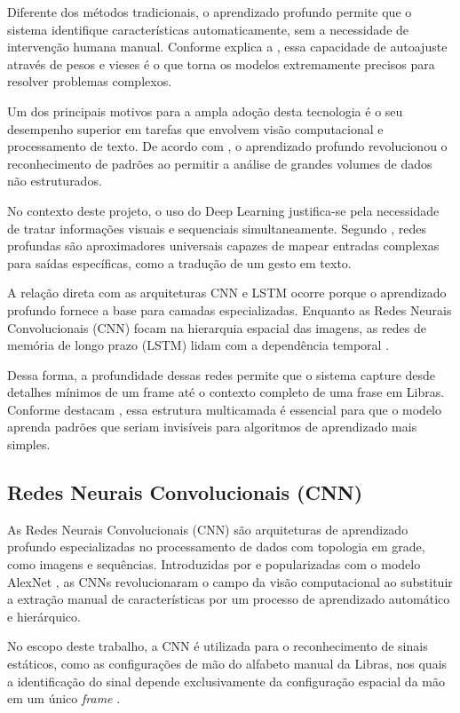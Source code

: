 \documentclass[
    12pt,                %
    openright,           %
    oneside,             %
    a4paper,             %
    english,             %
    brazil               %
]{abntex2}
\begin{document}
Diferente dos métodos tradicionais, o aprendizado profundo permite que o sistema identifique características automaticamente, sem a necessidade de intervenção humana manual. Conforme explica a , essa capacidade de autoajuste através de pesos e vieses é o que torna os modelos extremamente precisos para resolver problemas complexos.

Um dos principais motivos para a ampla adoção desta tecnologia é o seu desempenho superior em tarefas que envolvem visão computacional e processamento de texto. De acordo com , o aprendizado profundo revolucionou o reconhecimento de padrões ao permitir a análise de grandes volumes de dados não estruturados.

No contexto deste projeto, o uso do Deep Learning justifica-se pela necessidade de tratar informações visuais e sequenciais simultaneamente. Segundo , redes profundas são aproximadores universais capazes de mapear entradas complexas para saídas específicas, como a tradução de um gesto em texto.

A relação direta com as arquiteturas CNN e LSTM ocorre porque o aprendizado profundo fornece a base para camadas especializadas. Enquanto as Redes Neurais Convolucionais (CNN) focam na hierarquia espacial das imagens, as redes de memória de longo prazo (LSTM) lidam com a dependência temporal \cite{Hochreiter1997}.

Dessa forma, a profundidade dessas redes permite que o sistema capture desde detalhes mínimos de um frame até o contexto completo de uma frase em Libras. Conforme destacam , essa estrutura multicamada é essencial para que o modelo aprenda padrões que seriam invisíveis para algoritmos de aprendizado mais simples.

\subsection{Redes Neurais Convolucionais (CNN)}

As Redes Neurais Convolucionais (CNN) são arquiteturas de aprendizado profundo especializadas no processamento de dados com topologia em grade, como imagens e sequências. Introduzidas por  e popularizadas com o modelo AlexNet \cite{Krizhevsky2012}, as CNNs revolucionaram o campo da visão computacional ao substituir a extração manual de características por um processo de aprendizado automático e hierárquico.
 
No escopo deste trabalho, a CNN é utilizada para o reconhecimento de sinais estáticos, como as configurações de mão do alfabeto manual da Libras, nos quais a identificação do sinal depende exclusivamente da configuração espacial da mão em um único \textit{frame} \cite{Fleck2016}.
  
\end{document}
